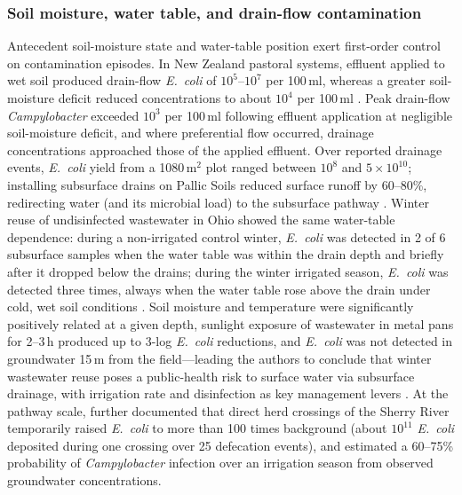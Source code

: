 \subsubsection{Soil moisture, water table, and drain-flow contamination}
Antecedent soil-moisture state and water-table position exert first-order control on contamination episodes. In New Zealand pastoral systems, effluent applied to wet soil produced drain-flow \textit{E.\ coli} of $10^{5}$--$10^{7}$ per 100\,ml, whereas a greater soil-moisture deficit reduced concentrations to about $10^{4}$ per 100\,ml \parencite{Collins2007}. Peak drain-flow \textit{Campylobacter} exceeded $10^{3}$ per 100\,ml following effluent application at negligible soil-moisture deficit, and where preferential flow occurred, drainage concentrations approached those of the applied effluent. Over reported drainage events, \textit{E.\ coli} yield from a 1080\,m$^{2}$ plot ranged between $10^{8}$ and $5\times10^{10}$; installing subsurface drains on Pallic Soils reduced surface runoff by 60--80\%, redirecting water (and its microbial load) to the subsurface pathway \parencite{Collins2007}. Winter reuse of undisinfected wastewater in Ohio showed the same water-table dependence: during a non-irrigated control winter, \textit{E.\ coli} was detected in 2 of 6 subsurface samples when the water table was within the drain depth and briefly after it dropped below the drains; during the winter irrigated season, \textit{E.\ coli} was detected three times, always when the water table rose above the drain under cold, wet soil conditions \parencite{Ding2021}. Soil moisture and temperature were significantly positively related at a given depth, sunlight exposure of wastewater in metal pans for 2--3\,h produced up to 3-log \textit{E.\ coli} reductions, and \textit{E.\ coli} was not detected in groundwater 15\,m from the field---leading the authors to conclude that winter wastewater reuse poses a public-health risk to surface water via subsurface drainage, with irrigation rate and disinfection as key management levers \parencite{Ding2021}. At the pathway scale, \textcite{Collins2007} further documented that direct herd crossings of the Sherry River temporarily raised \textit{E.\ coli} to more than 100 times background (about $10^{11}$ \textit{E.\ coli} deposited during one crossing over 25 defecation events), and estimated a 60--75\% probability of \textit{Campylobacter} infection over an irrigation season from observed groundwater concentrations.

